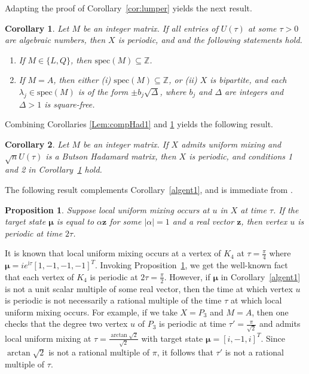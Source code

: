 \documentclass[11pt]{article}
\newtheorem{corollary}{Corollary}
\newtheorem{proposition}{Proposition}
\newcommand{\bz}{\mathbf z}
\newcommand{\bmu}{{\boldsymbol{\mu}}}
\def\ii{\mathrm{i}}
\newcommand\spec{{\mathrm{spec}}}
\def\Z{\mathbb{Z}}
\begin{document}
Adapting the proof of Corollary~\ref{cor:lumper} yields the next result.
\begin{corollary}
\label{cor:lumper1}
Let $M$ be an integer matrix. If all entries of $U(\tau)$ at some $\tau>0$ are algebraic numbers, then $X$ is periodic, and and 
the following statements hold.
\begin{enumerate}
\item If $M\in\{L,Q\}$, then $\spec(M)\subseteq\Z$. 
\item If $M=A$, then either (i) $\spec(M)\subseteq\Z$, or (ii) $X$ is bipartite, and each $\lambda_j\in\spec(M)$ is of the form $\pm b_j\sqrt{\Delta}$, where $b_j$ and $\Delta$ are integers and $\Delta>1$ is square-free.
\end{enumerate} 
\end{corollary}

Combining Corollaries \ref{Lem:compHad1} and \ref{cor:lumper1} yields the following result.

\begin{corollary}
\label{algent2}
Let $M$ be an integer matrix. If $X$ admits uniform mixing and $\sqrt{n}U(\tau)$ is a Butson Hadamard matrix, then $X$ is periodic, and conditions 1 and 2 in Corollary~\ref{cor:lumper1} hold. 
\end{corollary}

The following result complements Corollary~\ref{algent1}, and is immediate from \cite[Lemma 5.1]{godsil2025perfect}.

\begin{proposition}
\label{per2t}
Suppose local uniform mixing occurs at $u$ in $X$ at time $\tau$. If the target state $\bmu$ is equal to $\alpha\bz$ for some $|\alpha|=1$ and a real vector $\bz$, then vertex $u$ is periodic at time $2\tau$.
\end{proposition}

It is known that local uniform mixing occurs at a vertex of $K_4$ at $\tau=\frac{\pi}{4}$ where $\bmu=ie^{\ii\tau}[1,-1,-1,-1]^T$. Invoking Proposition~\ref{per2t}, we get the well-known fact that each vertex of $K_4$ is periodic at $2\tau=\frac{\pi}{2}$. However, if $\bmu$ in Corollary~\ref{algent1} is not a unit scalar multiple of some real vector, then the time at which vertex $u$ is periodic is not necessarily a rational multiple of the time $\tau$ at which local uniform mixing occurs. For example, if we take $X=P_3$ and $M=A$, then one checks that the degree two vertex $u$ of $P_3$ is periodic at time $\tau'=\frac{\pi}{\sqrt{2}}$ and admits local uniform mixing at $\tau=\frac{\arctan\sqrt{2}}{\sqrt{2}}$ with target state $\bmu=[i,-1,i]^T$. Since $\arctan\sqrt{2}$ is not a rational multiple of $\pi$, it follows that $\tau'$ is not a rational multiple of $\tau$.
\end{document}
